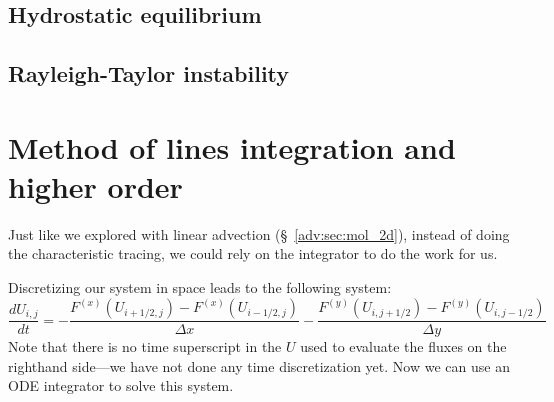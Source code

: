 \subsection{Hydrostatic equilibrium}



\subsection{Rayleigh-Taylor instability}



\section{Method of lines integration and higher order}

Just like we explored with linear advection (\S~\ref{adv:sec:mol_2d}),
instead of doing the characteristic tracing, we could rely on the
integrator to do the work for us.


Discretizing our system in space leads to the following system:
\begin{equation}
\frac{dU_{i,j}}{dt} = -\frac{F^{(x)}(U_{i+1/2,j}) - F^{(x)}(U_{i-1/2,j})}{\Delta x}
                      -\frac{F^{(y)}(U_{i,j+1/2}) - F^{(y)}(U_{i,j-1/2})}{\Delta y}
\end{equation}
Note that there is no time superscript in the $U$ used to evaluate the
fluxes on the righthand side---we have not done any time
discretization yet.  Now we can use an ODE integrator to solve this system.


